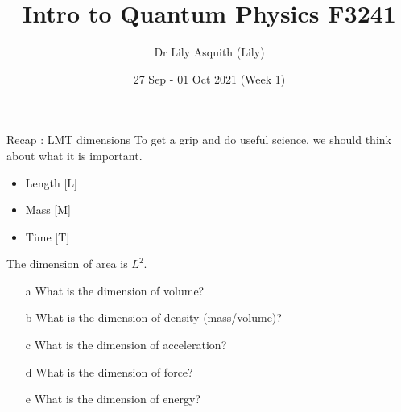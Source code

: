 


% 
\title[ Intro to Quantum Physics]{Intro to Quantum Physics F3241}
\author[Dr Lily Asquith (Lily)]{ Dr Lily Asquith (Lily)}
\date[27 Sep - 01 Oct 2021]{ 27 Sep - 01 Oct 2021 (Week 1)}





\begin{frame}
\titlepage
\end{frame} 



 \begin{frame}{Recap : LMT dimensions}
To get a grip and do useful science, we should think about what it is important.\\
\begin{itemize}
\item Length [L]\\
\item Mass [M]\\
\item Time [T]\
\end{itemize}

The dimension of area is $L^2$. \\[1ex]
\begin{itemize}
\item[a] What is the dimension of volume?\\[1ex]
\item[b] What is the dimension of density (mass/volume)?\\[1ex]
\item[c] What is the dimension of acceleration?\\[1ex]
\item[d] What is the dimension of force?\\[1ex]
\item[e] What is the dimension of energy?\\[1ex]
\end{itemize}
\end{frame}
 





